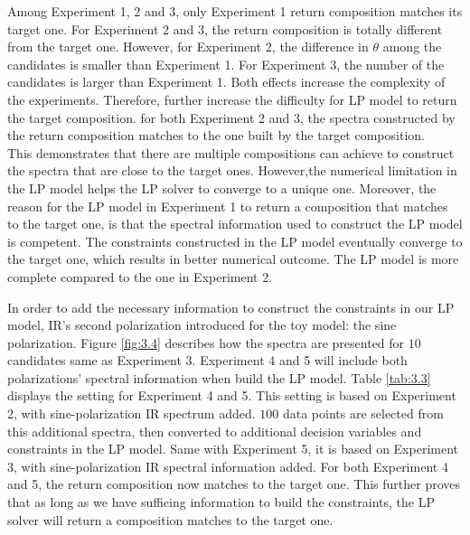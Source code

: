 Among Experiment 1, 2 and 3, only Experiment 1 return composition matches its target one. For Experiment 2 and 3, the return composition is totally different from the target one. However, for Experiment 2, the difference in $\theta$ among the candidates is smaller than Experiment 1. For Experiment 3, the number of the candidates is larger than Experiment 1. Both effects increase the complexity of the experiments. Therefore, further increase the difficulty for LP model to return the target composition. for both Experiment 2 and 3, the spectra constructed by the return composition matches to the one built by the target composition. \\

This demonstrates that there are multiple compositions can achieve to construct the spectra that are close to the target ones. However,the numerical limitation in the LP model helps the LP solver to converge to a unique one. Moreover, the reason for the LP model in Experiment 1 to return a composition that matches to the target one, is that the spectral information used to construct the LP model is competent. The constraints constructed in the LP model eventually converge to the target one, which results in better numerical outcome. The LP model is more complete compared to the one in Experiment 2. 


In order to add the necessary information to construct the constraints in our LP model, IR's second polarization introduced for the toy model: the sine polarization. Figure \ref{fig:3.4} describes how the spectra are presented for $10$ candidates same as Experiment 3. Experiment 4 and 5 will include both polarizations' spectral information when build the LP model. Table \ref{tab:3.3} displays the setting for Experiment 4 and 5. This setting is based on Experiment 2, with sine-polarization IR spectrum added. $100$ data points are selected from this additional spectra, then converted to additional decision variables and constraints in the LP model. Same with Experiment 5, it is based on Experiment 3, with sine-polarization IR spectral information added. For both Experiment 4 and 5, the return composition now matches to the target one. This further proves that as long as we have sufficing information to build the constraints, the LP solver will return a composition matches to the target one. \\ 

